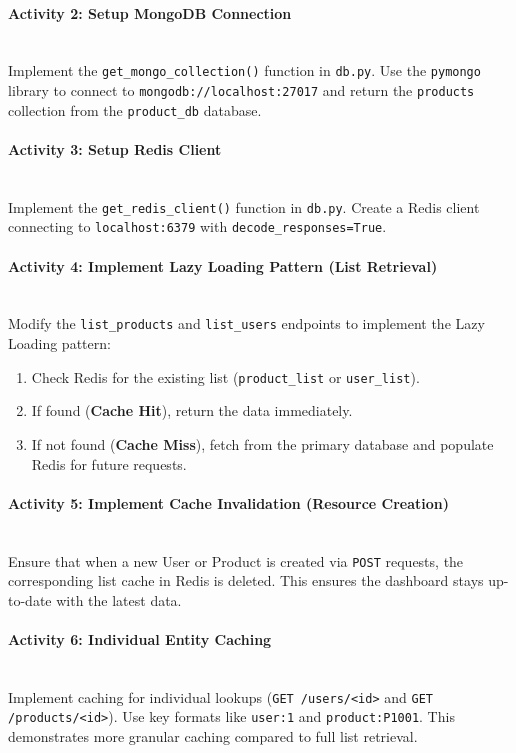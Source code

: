\paragraph{Activity 2: Setup MongoDB Connection}~\\
Implement the \texttt{get\_mongo_collection()} function in \texttt{db.py}. Use the \texttt{pymongo} library to connect to \texttt{mongodb://localhost:27017} and return the \texttt{products} collection from the \texttt{product\_db} database.

\paragraph{Activity 3: Setup Redis Client}~\\
Implement the \texttt{get\_redis\_client()} function in \texttt{db.py}. Create a Redis client connecting to \texttt{localhost:6379} with \texttt{decode\_responses=True}.

\paragraph{Activity 4: Implement Lazy Loading Pattern (List Retrieval)}~\\
Modify the \texttt{list\_products} and \texttt{list\_users} endpoints to implement the Lazy Loading pattern:
\begin{enumerate}
    \item Check Redis for the existing list (\texttt{product\_list} or \texttt{user\_list}).
    \item If found (\textbf{Cache Hit}), return the data immediately.
    \item If not found (\textbf{Cache Miss}), fetch from the primary database and populate Redis for future requests.
\end{enumerate}

\paragraph{Activity 5: Implement Cache Invalidation (Resource Creation)}~\\
Ensure that when a new User or Product is created via \texttt{POST} requests, the corresponding list cache in Redis is deleted. This ensures the dashboard stays up-to-date with the latest data.

\paragraph{Activity 6: Individual Entity Caching}~\\
Implement caching for individual lookups (\texttt{GET /users/<id>} and \texttt{GET /products/<id>}). Use key formats like \texttt{user:1} and \texttt{product:P1001}. This demonstrates more granular caching compared to full list retrieval.

